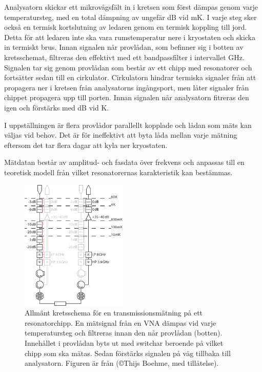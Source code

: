 \documentclass[main.tex]{subfiles}
\begin{document}
Analysatorn skickar ett mikrovågsfält in i kretsen som först dämpas genom varje temperatursteg, med en total dämpning av ungefär \unit[67]{dB} vid \unit[10]{mK}. I varje steg sker också en termisk kortslutning av ledaren genom en termisk koppling till jord. Detta för att ledaren inte ska vara rumstemperatur nere i kryostaten och skicka in termiskt brus. Innan signalen når provlådan, som befinner sig i botten av kretsschemat, filtreras den effektivt med ett bandpassfilter i intervallet \unit[4-8]{GHz}. Signalen tar sig genom provlådan som består av ett chipp med resonatorer och fortsätter sedan till en cirkulator. Cirkulatorn hindrar termiska signaler från att propagera ner i kretsen från analysatorns ingångsport, men låter signaler från chippet propagera upp till porten. Innan signalen når analysatorn fitreras den igen och förstärks med \unit[35-40]{dB} vid \unit[4]{K}.

I uppställningen är flera provlådor parallellt kopplade och lådan som mäts kan väljas vid behov. Det är för ineffektivt att byta låda mellan varje mätning eftersom det tar flera dagar att kyla ner kryostaten.

Mätdatan består av amplitud- och fasdata över frekvens och anpassas till en teoretisk modell från vilket resonatorernas karakteristik kan bestämmas.

\begin{figure}[H]
    \centering
    \includegraphics[width=0.45\textwidth]{figure/kretsar/cryo.pdf}
    \caption{Allmänt kretsschema för en transmissionsmätning på ett resonatorchipp.
    En mätsignal från en VNA dämpas vid varje temperatursteg och filtreras innan den når provlådan (botten). Innehållet i provlådan byts ut med switchar beroende på vilket chipp som ska mätas. Sedan förstärks signalen på väg tillbaka till analysatorn. Figuren är från \cite[fig. 3.7]{Boehme2016} (\copyright Thijs Boehme, med tillåtelse).}
    \label{fig:matuppstallning}
\end{figure}
\end{document}

